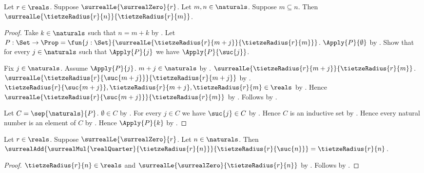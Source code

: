 \begin{theorem}\label{tietze_radius_antitone}
    Let $r\in\reals$.
    Suppose $\surrealLe{\surrealZero}{r}$.
    Let $m,n\in\naturals$.
    Suppose $m\subseteq n$.
    Then $\surrealLe{\tietzeRadius{r}{n}}{\tietzeRadius{r}{m}}$.
\end{theorem}
\begin{proof}
    Take $k\in\naturals$ such that $n=m+k$
        by .
    Let $P:\Set\to\Prop=\fun{j:\Set}{
        \surrealLe{\tietzeRadius{r}{m+j}}{\tietzeRadius{r}{m}}}$.
    $\Apply{P}{\emptyset}$
        by
        .
    Show that for every $j\in\naturals$ such that $\Apply{P}{j}$
        we have $\Apply{P}{\suc{j}}$.
    \begin{subproof}
        Fix $j\in\naturals$.
        Assume $\Apply{P}{j}$.
        $m+j\in\naturals$ by .
        $\surrealLe{\tietzeRadius{r}{m+j}}{\tietzeRadius{r}{m}}$.
        $\surrealLe{\tietzeRadius{r}{\suc{m+j}}}
            {\tietzeRadius{r}{m+j}}$
            by .
        $\tietzeRadius{r}{\suc{m+j}},\tietzeRadius{r}{m+j},
            \tietzeRadius{r}{m}\in\reals$
            by .
        Hence $\surrealLe{\tietzeRadius{r}{\suc{m+j}}}
            {\tietzeRadius{r}{m}}$
            by .
        Follows by .
    \end{subproof}
    Let $C=\sep{\naturals}{P}$.
    $\emptyset\in C$ by .
    For every $j\in C$ we have $\suc{j}\in C$
        by .
    Hence $C$ is an inductive set by .
    Hence every natural number is an element of $C$
        by .
    Hence $\Apply{P}{k}$ by .
\end{proof}

\begin{proposition}\label{tietze_radius_quarter_spending}
    Let $r\in\reals$.
    Suppose $\surrealLe{\surrealZero}{r}$.
    Let $n\in\naturals$.
    Then
        $\surrealAdd{
            \surrealMul{\realQuarter}{\tietzeRadius{r}{n}}}
            {\tietzeRadius{r}{\suc{n}}}
        =\tietzeRadius{r}{n}$.
\end{proposition}
\begin{proof}
    $\tietzeRadius{r}{n}\in\reals$ and
        $\surrealLe{\surrealZero}{\tietzeRadius{r}{n}}$
        by .
    Follows by
        .
\end{proof}

